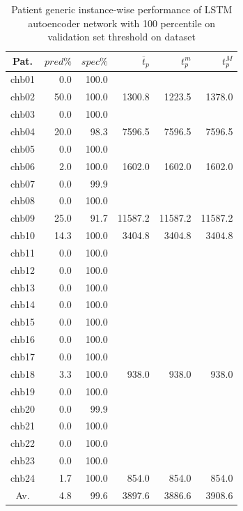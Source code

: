 \begin{table}[ht]
    \centering
    \begin{tabular}{c|rrrrr}
    Pat.  & $pred\%$ & $spec\%$ & $\overline{t}_p$   & $t_p^m$  & $t_p^M$   \\ \hline
    chb01   & 0.0    & 100.0  &         &         &         \\
    chb02   & 50.0   & 100.0  & 1300.8  & 1223.5  & 1378.0  \\
    chb03   & 0.0    & 100.0  &         &         &         \\
    chb04   & 20.0   & 98.3   & 7596.5  & 7596.5  & 7596.5  \\
    chb05   & 0.0    & 100.0  &         &         &         \\
    chb06   & 2.0    & 100.0  & 1602.0  & 1602.0  & 1602.0  \\
    chb07   & 0.0    & 99.9   &         &         &         \\
    chb08   & 0.0    & 100.0  &         &         &         \\
    chb09   & 25.0   & 91.7   & 11587.2 & 11587.2 & 11587.2 \\
    chb10   & 14.3   & 100.0  & 3404.8  & 3404.8  & 3404.8  \\
    chb11   & 0.0    & 100.0  &         &         &         \\
    chb12   & 0.0    & 100.0  &         &         &         \\
    chb13   & 0.0    & 100.0  &         &         &         \\
    chb14   & 0.0    & 100.0  &         &         &         \\
    chb15   & 0.0    & 100.0  &         &         &         \\
    chb16   & 0.0    & 100.0  &         &         &         \\
    chb17   & 0.0    & 100.0  &         &         &         \\
    chb18   & 3.3    & 100.0  & 938.0   & 938.0   & 938.0   \\
    chb19   & 0.0    & 100.0  &         &         &         \\
    chb20   & 0.0    & 99.9   &         &         &         \\
    chb21   & 0.0    & 100.0  &         &         &         \\
    chb22   & 0.0    & 100.0  &         &         &         \\
    chb23   & 0.0    & 100.0  &         &         &         \\
    chb24   & 1.7    & 100.0  & 854.0   & 854.0   & 854.0   \\ \hline
    Av.     & 4.8    & 99.6   & 3897.6  & 3886.6  & 3908.6  \\ \hline
    \end{tabular}
    \caption{Patient generic instance-wise performance of LSTM autoencoder network with 100 percentile on validation set threshold on  dataset}
    \label{tab:patient-generic-100perc-lstm-instance} 
\end{table}

